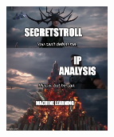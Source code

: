 \documentclass[10pt,conference,compsocconf]{IEEEtran}
\begin{document}
\begin{figure}[h]
  \includegraphics[width=0.3\textwidth]{meme/pets_meme_6.jpg}
\end{figure}
\end{document}
